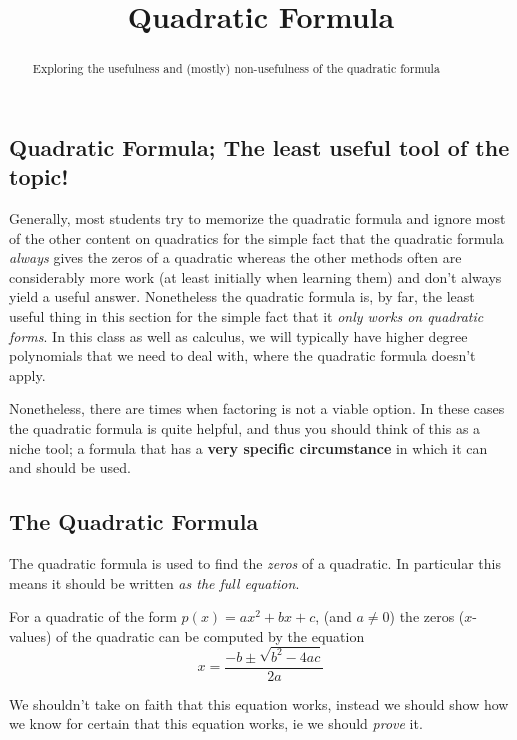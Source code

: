 \documentclass{ximera}
\title{Quadratic Formula}
\begin{document}
\begin{abstract}
    Exploring the usefulness and (mostly) non-usefulness of the quadratic formula
\end{abstract}
\maketitle

\subsection{Quadratic Formula; The least useful tool of the topic!}

    Generally, most students try to memorize the quadratic formula and ignore most of the other content on quadratics for the simple fact that the quadratic formula \textit{always} gives the zeros of a quadratic whereas the other methods often are considerably more work (at least initially when learning them) and don't always yield a useful answer. Nonetheless the quadratic formula is, by far, the least useful thing in this section for the simple fact that it \textit{only works on quadratic forms}. In this class as well as calculus, we will typically have higher degree polynomials that we need to deal with, where the quadratic formula doesn't apply. 
    
    Nonetheless, there are times when factoring is not a viable option. In these cases the quadratic formula is quite helpful, and thus you should think of this as a niche tool; a formula that has a \textbf{very specific circumstance} in which it can and should be used.

\subsection*{The Quadratic Formula}

    The quadratic formula is used to find the \textit{zeros} of a quadratic. In particular this means it should be written \textit{as the full equation}. 

    \begin{theorem}
        For a quadratic of the form $p(x) = ax^2 + bx + c$, (and $a \neq 0$) the zeros ($x$-values) of the quadratic can be computed by the equation
        \[
        x = \dfrac{-b \pm \sqrt{b^2 - 4ac}}{2a}
        \]
    \end{theorem}
    
    We shouldn't take on faith that this equation works, instead we should show how we know for certain that this equation works, ie we should \textit{prove} it.
    
\end{document}
